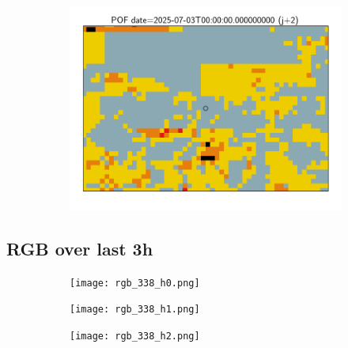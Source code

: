 \documentclass{article}
\begin{document}
\begin{figure}[H]
\begin{subfigure}[b]{0.31\textwidth}
    \end{subfigure}
    \begin{subfigure}[b]{0.36\textwidth}
        \centering
        \includegraphics[width=0.85\linewidth]{pof_338_j2.png} %
    \end{subfigure}
\end{figure}


\vspace{-1em}
\subsection*{RGB over last 3h}
\vspace{-1em}
\begin{figure}[H]
    \centering
    \begin{subfigure}[b]{0.32\textwidth}
        \centering
        \texttt{[image: rgb\_338\_h0.png]} %
    \end{subfigure}
    \begin{subfigure}[b]{0.32\textwidth}
        \centering
        \texttt{[image: rgb\_338\_h1.png]} %
    \end{subfigure}
    \begin{subfigure}[b]{0.32\textwidth}
        \centering
        \texttt{[image: rgb\_338\_h2.png]} %
    \end{subfigure}
\end{figure}
\end{document}
